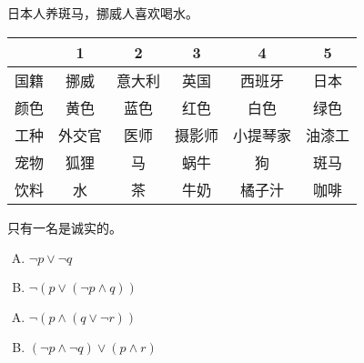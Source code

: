 {{        %
        \begin{practices}
            日本人养斑马，挪威人喜欢喝水。

            \begin{table}[H]
                \begin{tabular}{c|c|c|c|c|c}
                    \hline
                    & 1 & 2 & 3 & 4 & 5 \\
                    \hline
                    国籍 & 挪威 & 意大利 & 英国 & 西班牙 & 日本 \\
                    颜色 & 黄色 & 蓝色 & 红色 & 白色 & 绿色 \\
                    工种 & 外交官 & 医师 & 摄影师 & 小提琴家 & 油漆工 \\
                    宠物 & 狐狸 & 马 & 蜗牛 & 狗 & 斑马 \\
                    饮料 & 水 & 茶 & 牛奶 & 橘子汁 & 咖啡 \\
                    \hline
                \end{tabular}
            \end{table}
        \end{practices}

        \begin{practices}
            只有一名是诚实的。
        \end{practices}

        \begin{practices}
            \begin{enumerate}[A.]
                \item $\neg p \vee \neg q$
                \item $\neg (p \vee (\neg p \wedge q))$
            \end{enumerate}
        \end{practices}

        \begin{practices}
            \begin{enumerate}[A.]
                \item $\neg (p \wedge (q \vee \neg r))$
                \item $(\neg p \wedge \neg q) \vee (p \wedge r)$
            \end{enumerate}
        \end{practices}

}}
